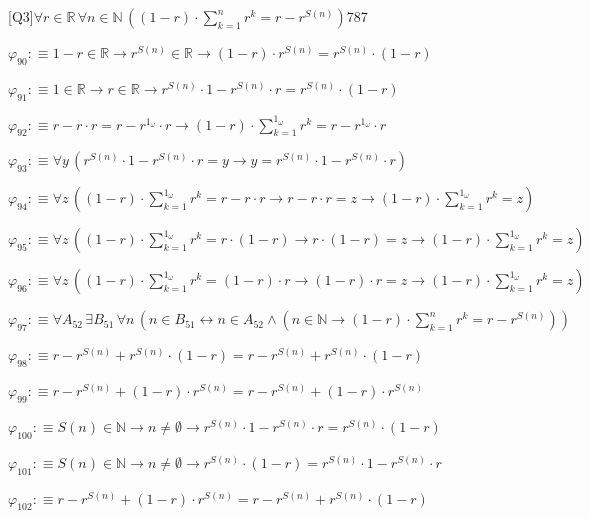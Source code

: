 \begin{fullproof}{[Q3]}{$\forall r \in \mathbb{R}\,\forall n \in \mathbb{N}\,((1 - r) \cdot {\textstyle\sum_{k=1}^{n} {{r}^{k}}} = r - {{r}^{S(n)}})$}{787}
\begin{abbrevlist}
\item $\varphi_{90} :\equiv 1 - r \in \mathbb{R} \to {{r}^{S(n)}} \in \mathbb{R} \to (1 - r) \cdot {{r}^{S(n)}} = {{r}^{S(n)}} \cdot (1 - r)$
\item $\varphi_{91} :\equiv 1 \in \mathbb{R} \to r \in \mathbb{R} \to {{r}^{S(n)}} \cdot 1 - {{r}^{S(n)}} \cdot r = {{r}^{S(n)}} \cdot (1 - r)$
\item $\varphi_{92} :\equiv r - r \cdot r = r - {{r}^{1_{\omega}}} \cdot r \to (1 - r) \cdot {\textstyle\sum_{k=1}^{1_{\omega}} {{r}^{k}}} = r - {{r}^{1_{\omega}}} \cdot r$
\item $\varphi_{93} :\equiv \forall y\,({{r}^{S(n)}} \cdot 1 - {{r}^{S(n)}} \cdot r = y \to y = {{r}^{S(n)}} \cdot 1 - {{r}^{S(n)}} \cdot r)$
\item $\varphi_{94} :\equiv \forall z\,((1 - r) \cdot {\textstyle\sum_{k=1}^{1_{\omega}} {{r}^{k}}} = r - r \cdot r \to r - r \cdot r = z \to (1 - r) \cdot {\textstyle\sum_{k=1}^{1_{\omega}} {{r}^{k}}} = z)$
\item $\varphi_{95} :\equiv \forall z\,((1 - r) \cdot {\textstyle\sum_{k=1}^{1_{\omega}} {{r}^{k}}} = r \cdot (1 - r) \to r \cdot (1 - r) = z \to (1 - r) \cdot {\textstyle\sum_{k=1}^{1_{\omega}} {{r}^{k}}} = z)$
\item $\varphi_{96} :\equiv \forall z\,((1 - r) \cdot {\textstyle\sum_{k=1}^{1_{\omega}} {{r}^{k}}} = (1 - r) \cdot r \to (1 - r) \cdot r = z \to (1 - r) \cdot {\textstyle\sum_{k=1}^{1_{\omega}} {{r}^{k}}} = z)$
\item $\varphi_{97} :\equiv \forall A_{52}\,\exists B_{51}\,\forall n\,(n \in B_{51} \leftrightarrow n \in A_{52} \land (n \in \mathbb{N} \to (1 - r) \cdot {\textstyle\sum_{k=1}^{n} {{r}^{k}}} = r - {{r}^{S(n)}}))$
\item $\varphi_{98} :\equiv r - {{r}^{S(n)}} + {{r}^{S(n)}} \cdot (1 - r) = r - {{r}^{S(n)}} + {{r}^{S(n)}} \cdot (1 - r)$
\item $\varphi_{99} :\equiv r - {{r}^{S(n)}} + (1 - r) \cdot {{r}^{S(n)}} = r - {{r}^{S(n)}} + (1 - r) \cdot {{r}^{S(n)}}$
\item $\varphi_{100} :\equiv S(n) \in \mathbb{N} \to n \neq \emptyset \to {{r}^{S(n)}} \cdot 1 - {{r}^{S(n)}} \cdot r = {{r}^{S(n)}} \cdot (1 - r)$
\item $\varphi_{101} :\equiv S(n) \in \mathbb{N} \to n \neq \emptyset \to {{r}^{S(n)}} \cdot (1 - r) = {{r}^{S(n)}} \cdot 1 - {{r}^{S(n)}} \cdot r$
\item $\varphi_{102} :\equiv r - {{r}^{S(n)}} + (1 - r) \cdot {{r}^{S(n)}} = r - {{r}^{S(n)}} + {{r}^{S(n)}} \cdot (1 - r)$

\end{abbrevlist}
\end{fullproof}
